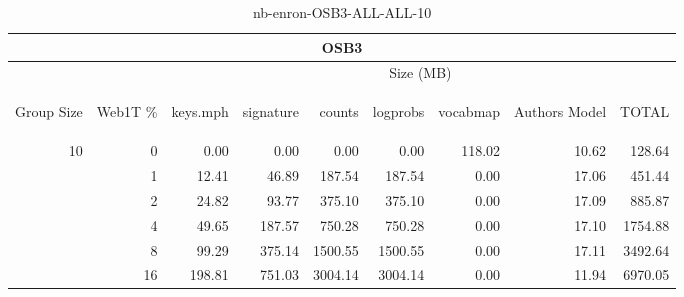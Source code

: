 \begin{center}
\begin{table}[htbp]
\begin{tabular}{ | r | r | r | r | r | r | r | r | r |}
\hline
\multicolumn{9}{|c|}{OSB3}\\
\hline
 & & \multicolumn{7}{|c|}{Size (MB)}\\ \cline{3-9}
\begin{sideways}Group Size\end{sideways} & \begin{sideways}Web1T \% \end{sideways} & \begin{sideways}keys.mph\end{sideways} & \begin{sideways}signature\end{sideways} & \begin{sideways}counts\end{sideways} & \begin{sideways}logprobs\end{sideways} & \begin{sideways}vocabmap\end{sideways} & \begin{sideways}Authors Model \end{sideways} & \begin{sideways}TOTAL\end{sideways}\\
\hline
\multirow{5}{*}{10}
 & 0 & 0.00 & 0.00 & 0.00 & 0.00 & 118.02 & 10.62 & 128.64\\ \cline{2-9}
 & 1 & 12.41 & 46.89 & 187.54 & 187.54 & 0.00 & 17.06 & 451.44\\ \cline{2-9}
 & 2 & 24.82 & 93.77 & 375.10 & 375.10 & 0.00 & 17.09 & 885.87\\ \cline{2-9}
 & 4 & 49.65 & 187.57 & 750.28 & 750.28 & 0.00 & 17.10 & 1754.88\\ \cline{2-9}
 & 8 & 99.29 & 375.14 & 1500.55 & 1500.55 & 0.00 & 17.11 & 3492.64\\ \cline{2-9}
 & 16 & 198.81 & 751.03 & 3004.14 & 3004.14 & 0.00 & 11.94 & 6970.05\\ \cline{2-9}
\hline
\end{tabular}
\caption{nb-enron-OSB3-ALL-ALL-10}
\label{table:nb-enron-OSB3-ALL-ALL-10}
\end{table}
\end{center}

